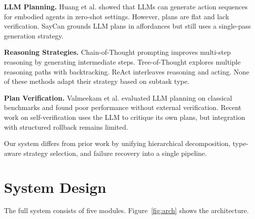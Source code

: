 \documentclass{article}
\begin{document}
\textbf{LLM Planning.} Huang et al. \citep{huang2022language} showed that LLMs can generate action sequences for embodied agents in zero-shot settings. However, plans are flat and lack verification. SayCan \citep{ahn2022saycan} grounds LLM plans in affordances but still uses a single-pass generation strategy.

\textbf{Reasoning Strategies.} Chain-of-Thought prompting \citep{wei2022chain} improves multi-step reasoning by generating intermediate steps. Tree-of-Thought \citep{yao2023tree} explores multiple reasoning paths with backtracking. ReAct \citep{yao2023react} interleaves reasoning and acting. None of these methods adapt their strategy based on subtask type.

\textbf{Plan Verification.} Valmeekam et al. \citep{valmeekam2023planning} evaluated LLM planning on classical benchmarks and found poor performance without external verification. Recent work on self-verification uses the LLM to critique its own plans, but integration with structured rollback remains limited.

Our system differs from prior work by unifying hierarchical decomposition, type-aware strategy selection, and failure recovery into a single pipeline.

\section{System Design}

The full system consists of five modules. Figure~\ref{fig:arch} shows the architecture.
\end{document}
